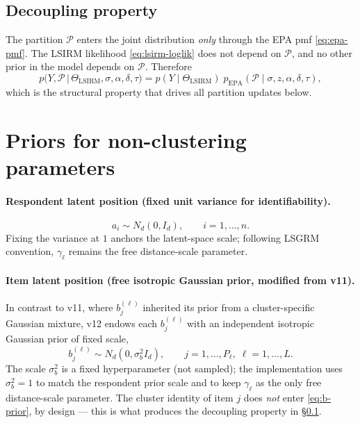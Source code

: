 \documentclass[11pt]{article}
\DeclareMathOperator{\EPA}{EPA}
\begin{document}
\subsection{Decoupling property}
\label{sec:decouple}

The partition $\mathcal{P}$ enters the joint distribution \emph{only} through
the EPA pmf \eqref{eq:epa-pmf}.  The LSIRM likelihood
\eqref{eq:lsirm-loglik} does not depend on $\mathcal{P}$, and no other prior
in the model depends on $\mathcal{P}$.  Therefore
\begin{equation}
    p\bigl(Y,\mathcal{P}\,\big|\,\Theta_{\mathrm{LSIRM}},\sigma,\alpha,\delta,\tau\bigr)
    =
    p(Y\mid\Theta_{\mathrm{LSIRM}})\;
    p_{\EPA}(\mathcal{P}\mid\sigma,z,\alpha,\delta,\tau),
    \label{eq:joint-decouple}
\end{equation}
which is the structural property that drives all partition updates below.

\section{Priors for non-clustering parameters}

\paragraph{Respondent latent position (fixed unit variance for identifiability).}
\begin{equation}
    a_i\sim N_d(0,I_d),\qquad i=1,\dots,n.
    \label{eq:a-prior}
\end{equation}
Fixing the variance at $1$ anchors the latent-space scale; following LSGRM
convention, $\gamma_\ell$ remains the free distance-scale parameter.

\paragraph{Item latent position (free isotropic Gaussian prior, modified from v11).}
In contrast to v11, where $b_j^{(\ell)}$ inherited its prior from a
cluster-specific Gaussian mixture, v12 endows each $b_j^{(\ell)}$ with an
independent isotropic Gaussian prior of fixed scale,
\begin{equation}
    b_j^{(\ell)}\sim N_d(0,\sigma_b^2 I_d),
    \qquad j=1,\dots,P_\ell,\;\ell=1,\dots,L.
    \label{eq:b-prior}
\end{equation}
The scale $\sigma_b^2$ is a fixed hyperparameter (not sampled); the
implementation uses $\sigma_b^2=1$ to match the respondent prior scale and to
keep $\gamma_\ell$ as the only free distance-scale parameter.  The cluster
identity of item $j$ does \emph{not} enter \eqref{eq:b-prior}, by design ---
this is what produces the decoupling property in §\ref{sec:decouple}.
\end{document}
